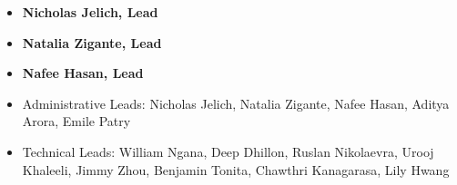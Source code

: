 \documentclass[main.tex]{subfiles}
\begin{document}
\begin{multicols}{3}
    \begin{itemize}[label={},noitemsep]
    \item \textbf{Nicholas Jelich, Lead}
    \end{itemize}
    \begin{itemize}[label={},noitemsep]
    \item \textbf{Natalia Zigante, Lead}
    \end{itemize}
    \begin{itemize}[label={},noitemsep]
    \item \textbf{Nafee Hasan, Lead}
    \end{itemize}
\end{multicols}
\begin{itemize}
    \item Administrative Leads: Nicholas Jelich, Natalia Zigante, Nafee Hasan, Aditya Arora, Emile Patry
    \item Technical Leads: William Ngana, Deep Dhillon, Ruslan Nikolaevra, Urooj Khaleeli, Jimmy Zhou, Benjamin Tonita, Chawthri Kanagarasa, Lily Hwang
\end{itemize}
\end{document}
